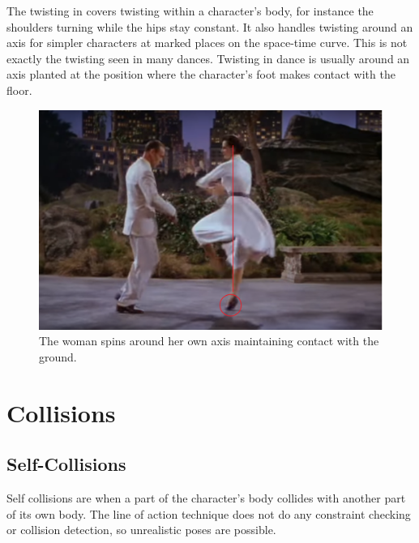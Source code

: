 The twisting in \citep{guay2015space} covers twisting within a character's body, for instance the shoulders turning while the hips stay constant. It also handles twisting around an axis for simpler characters at marked places on the space-time curve. This is not exactly the twisting seen in many dances. Twisting in dance is usually around an axis planted at the position where the character's foot makes contact with the floor.


\begin{figure}[!h]
\centering
\includegraphics[scale=0.5]{img/twistinghuman}
\caption{The woman spins around her own axis maintaining contact with the ground.}
\end{figure}


\section{Collisions}
\subsection{Self-Collisions}
Self collisions are when a part of the character's body collides with another part of its own body. The line of action technique does not do any constraint checking or collision detection, so unrealistic poses are possible. 

